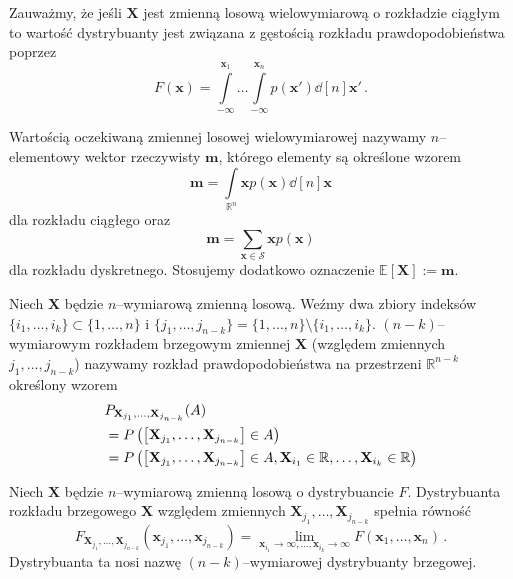 \documentclass{myclass}
\numberwithin{equation}{section}
\begin{document}
Zauważmy, że jeśli \(\mathbf{X}\) jest zmienną losową wielowymiarową o rozkładzie ciągłym to wartość
dystrybuanty jest związana z gęstością rozkładu prawdopodobieństwa poprzez
\begin{equation}
    F(\mathbf{x}) = \int\limits_{-\infty}^{\mathbf{x}_1}\ldots\int\limits_{-\infty}^{\mathbf{x}_n} p(\mathbf{x}') \dd[n]{\mathbf{x}'}\,.
\end{equation}

\begin{definition}
Wartością oczekiwaną zmiennej losowej wielowymiarowej nazywamy \(n\)--elementowy wektor rzeczywisty
\(\mathbf{m}\), którego elementy są określone wzorem
\begin{equation*}
    \mathbf{m} = \int\limits_{\mathbb{R}^n} \mathbf{x} p(\mathbf{x}) \dd[n]{\mathbf{x}}
\end{equation*}
dla rozkładu ciągłego oraz
\begin{equation*}
    \mathbf{m} = \sum_{\mathbf{x} \in \mathcal{S}} \mathbf{x} p(\mathbf{x})
\end{equation*}
dla rozkładu dyskretnego. Stosujemy dodatkowo oznaczenie \(\mathbb{E}[\mathbf{X}] := \mathbf{m}\).
\end{definition}

\begin{definition}
Niech \(\mathbf{X}\) będzie \(n\)--wymiarową zmienną losową. Weźmy dwa zbiory indeksów
\(\{i_1,\ldots,i_k\} \subset \{1,\ldots,n\}\) i \(\{j_1,\ldots,j_{n-k}\} = \{1,\ldots,n\} \setminus
\{i_1,\ldots,i_k\}\). \((n-k)\)--wymiarowym rozkładem brzegowym zmiennej \(\mathbf{X}\) (względem
zmiennych \(j_1,\ldots,j_{n-k}\)) nazywamy rozkład prawdopodobieństwa na przestrzeni
\(\mathbb{R}^{n-k}\) określony wzorem
\begin{equation*}
    \begin{split}
        &P_{\mathbf{X}_{j_1},\ldots,\mathbf{X}_{j_{n-k}}}(A) \\
        &= P\left(\mqty[\mathbf{X}_{j_1},\ldots,\mathbf{X}_{j_{n-k}}] \in A\right)\\
        &= P\left(\mqty[\mathbf{X}_{j_1},\ldots,\mathbf{X}_{j_{n-k}}] \in A, \mathbf{X}_{i_1} \in \mathbb{R}, \ldots, \mathbf{X}_{i_k} \in \mathbb{R}\right)
    \end{split}
\end{equation*}    
\end{definition}

Niech \(\mathbf{X}\) będzie \(n\)--wymiarową zmienną losową o dystrybuancie \(F\). Dystrybuanta
rozkładu brzegowego \(\mathbf{X}\) względem zmiennych
\(\mathbf{X}_{j_1},\ldots,\mathbf{X}_{j_{n-k}}\) spełnia równość
\begin{equation}
    F_{\mathbf{X}_{j_1},\ldots,\mathbf{X}_{j_{n-k}}}(\mathbf{x}_{j_1},\ldots,\mathbf{x}_{j_{n-k}}) = \lim_{\mathbf{x}_{i_1} \to \infty,\ldots,\mathbf{x}_{i_k} \to \infty} F(\mathbf{x}_1,\ldots,\mathbf{x}_n)\,.
\end{equation}
Dystrybuanta ta nosi nazwę \((n-k)\)--wymiarowej dystrybuanty brzegowej.
\end{document}
